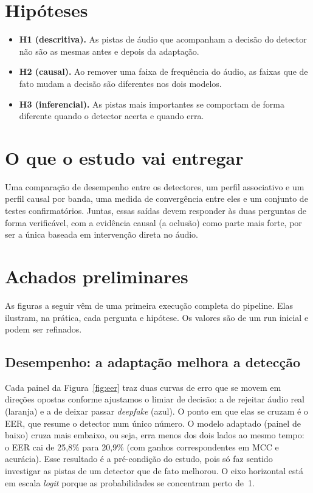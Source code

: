 \documentclass[11pt,a4paper]{article}
\begin{document}
\section{Hipóteses}

\begin{itemize}[nosep]
  \item \textbf{H1 (descritiva).} As pistas de áudio que acompanham a decisão do
        detector não são as mesmas antes e depois da adaptação.
  \item \textbf{H2 (causal).} Ao remover uma faixa de frequência do áudio, as
        faixas que de fato mudam a decisão são diferentes nos dois modelos.
  \item \textbf{H3 (inferencial).} As pistas mais importantes se comportam de
        forma diferente quando o detector acerta e quando erra.
\end{itemize}

\section{O que o estudo vai entregar}

Uma comparação de desempenho entre os detectores, um perfil associativo e um
perfil causal por banda, uma medida de convergência entre eles e um conjunto de
testes confirmatórios. Juntas, essas saídas devem responder às duas perguntas de
forma verificável, com a evidência causal (a oclusão) como parte mais forte, por
ser a única baseada em intervenção direta no áudio.

\section{Achados preliminares}

As figuras a seguir vêm de uma primeira execução completa do pipeline. Elas
ilustram, na prática, cada pergunta e hipótese. Os valores são de um run inicial e
podem ser refinados.

\subsection*{Desempenho: a adaptação melhora a detecção}

Cada painel da Figura~\ref{fig:eer} traz duas curvas de erro que se movem em
direções opostas conforme ajustamos o limiar de decisão: a de rejeitar áudio real
(laranja) e a de deixar passar \emph{deepfake} (azul). O ponto em que elas se
cruzam é o EER, que resume o detector num único número. O modelo adaptado (painel
de baixo) cruza mais embaixo, ou seja, erra menos dos dois lados ao mesmo tempo: o
EER cai de 25,8\% para 20,9\% (com ganhos correspondentes em MCC e acurácia). Esse
resultado é a pré-condição do estudo, pois só faz sentido investigar as pistas de
um detector que de fato melhorou. O eixo horizontal está em escala \emph{logit}
porque as probabilidades se concentram perto de~1.
\end{document}
